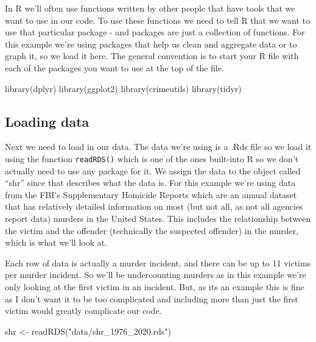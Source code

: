 \documentclass[
]{krantz}
\makeatletter
\newenvironment{Shaded}{\begin{snugshade}}{\end{snugshade}}
\newcommand{\FunctionTok}[1]{\textcolor[rgb]{0,0,0}{#1}}
\newcommand{\NormalTok}[1]{#1}
\newcommand{\OtherTok}[1]{\textcolor[rgb]{0.37,0.37,0.37}{#1}}
\newcommand{\StringTok}[1]{\textcolor[rgb]{0.5,0.5,0.5}{#1}}
\newenvironment{kframe}{%
\medskip{}
\setlength{\fboxsep}{.8em}
 \def\at@end@of@kframe{}%
 \ifinner\ifhmode%
  \def\at@end@of@kframe{\end{minipage}}%
  \begin{minipage}{\columnwidth}%
 \fi\fi%
 \def\FrameCommand##1{\hskip\@totalleftmargin \hskip-\fboxsep
 \colorbox{shadecolor}{##1}\hskip-\fboxsep
     \hskip-\linewidth \hskip-\@totalleftmargin \hskip\columnwidth}%
 \MakeFramed {\advance\hsize-\width
   \@totalleftmargin\z@ \linewidth\hsize
   \@setminipage}}%
 {\par\unskip\endMakeFramed%
 \at@end@of@kframe}
\renewenvironment{Shaded}{\begin{kframe}}{\end{kframe}}
\makeatother
\begin{document}
In R we'll often use functions written by other people that have tools that we want to use in our code. To use these functions we need to tell R that we want to use that particular package - and packages are just a collection of functions. For this example we're using packages that help us clean and aggregate data or to graph it, so we load it here. The general convention is to start your R file with each of the packages you want to use at the top of the file.

\begin{Shaded}
\begin{Highlighting}[]
\FunctionTok{library}\NormalTok{(dplyr)    }
\FunctionTok{library}\NormalTok{(ggplot2)    }
\FunctionTok{library}\NormalTok{(crimeutils) }
\FunctionTok{library}\NormalTok{(tidyr)      }
\end{Highlighting}
\end{Shaded}

\hypertarget{loading-data}{%
\subsection{Loading data}\label{loading-data}}

Next we need to load in our data. The data we're using is a .Rds file so we load it using the function \texttt{readRDS()} which is one of the ones built-into R so we don't actually need to use any package for it. We assign the data to the object called ``shr'' since that describes what the data is. For this example we're using data from the FBI's Supplementary Homicide Reports which are an annual dataset that has relatively detailed information on most (but not all, as not all agencies report data) murders in the United States. This includes the relationship between the victim and the offender (technically the suspected offender) in the murder, which is what we'll look at.

Each row of data is actually a murder incident, and there can be up to 11 victims per murder incident. So we'll be undercounting murders as in this example we're only looking at the first victim in an incident. But, as its an example this is fine as I don't want it to be too complicated and including more than just the first victim would greatly complicate our code.

\begin{Shaded}
\begin{Highlighting}[]
\NormalTok{shr }\OtherTok{\textless{}{-}} \FunctionTok{readRDS}\NormalTok{(}\StringTok{"data/shr\_1976\_2020.rds"}\NormalTok{) }
\end{Highlighting}
\end{Shaded}
\end{document}
